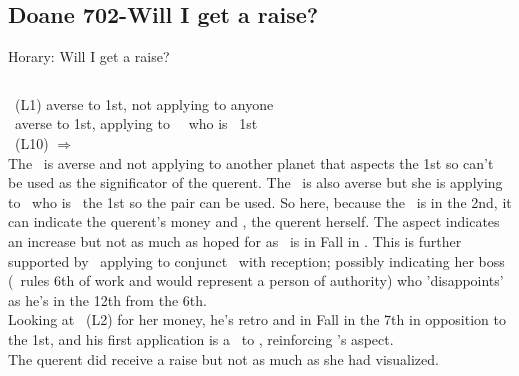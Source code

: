 \subsection{Doane 702-Will I get a raise?}
\begin{frame}[t]{Horary: Will I get a raise?}
\begin{columns}[T, onlytextwidth]
\footnotesize
{}
\Sun\ (L1) averse to 1st, not applying to anyone \\
\Moon\ averse to 1st, applying to \Square\ \Jupiter\ who is \Trine\ 1st \\
\Venus\ (L10) $\Rightarrow$ \Conjunction\ \Saturn \\

\vspace{0.25cm}
The \Sun\ is averse and not applying to another planet that aspects the 1st so can't be used as the significator of the querent. The \Moon\ is also averse but she is applying to \Jupiter\ who is \Trine\ the 1st so the pair can be used. So here, because the \Moon\ is in the 2nd, it can indicate the querent's money and \Jupiter, the querent herself. The aspect indicates an increase but not as much as hoped for as \Jupiter\ is in Fall in \Capricorn. This is further supported by \Jupiter\ applying to conjunct \Saturn\ with reception; possibly indicating her boss (\Saturn\ rules 6th of work and would represent a person of authority) who 'disappoints' as he's in the 12th from the 6th.\\

\vspace{0.2cm}
Looking at \Mercury\ (L2) for her money, he's retro and in Fall in the 7th in opposition to the 1st, and his first application is a \Sextile\ to \Saturn, reinforcing \Jupiter's aspect.\\

\vspace{0.2cm}
The querent did receive a raise but not as much as she had visualized.



\end{columns}
\end{frame}

